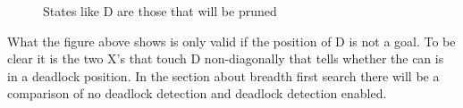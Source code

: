\documentclass[../../main.tex]{subfiles}
\begin{document}
\begin{figure}[h]
	\centering

	\caption{States like D are those that will be pruned}
	\label{fig:basic_deadlock_detection}
\end{figure}

\newpage %
What the figure above shows is only valid if the position of D is not a goal. To be clear it is the two X's that touch D non-diagonally that tells whether the can is in a deadlock position. In the section about breadth first search there will be a comparison of no deadlock detection and deadlock detection enabled.
\end{document}
